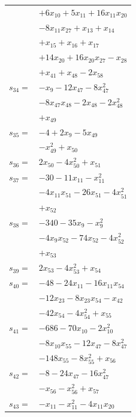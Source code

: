 \begin{longtable}{@{}r@{\;}l@{}}
 & \(\displaystyle +6x_{10} +5x_{11} +16x_{11}x_{20}\) \\
 & \(\displaystyle -8x_{11}x_{27} +x_{13} +x_{14}\) \\
 & \(\displaystyle +x_{15} +x_{16} +x_{17}\) \\
 & \(\displaystyle +14x_{20} +16x_{20}x_{27} -x_{28}\) \\
 & \(\displaystyle +x_{41} +x_{48} -2x_{58}\) \\[3pt]
\(s_{34}=\) & \(\displaystyle -x_{9} -12x_{47} -8x_{47}^{2}\) \\
 & \(\displaystyle -8x_{47}x_{48} -2x_{48} -2x_{48}^{2}\) \\
 & \(\displaystyle +x_{49}\) \\[3pt]
\(s_{35}=\) & \(\displaystyle -4 +2x_{9} -5x_{49}\) \\
 & \(\displaystyle -x_{49}^{2} +x_{50}\) \\[3pt]
\(s_{36}=\) & \(\displaystyle 2x_{50} -4x_{50}^{2} +x_{51}\) \\[3pt]
\(s_{37}=\) & \(\displaystyle -30 -11x_{11} -x_{11}^{2}\) \\
 & \(\displaystyle -4x_{11}x_{51} -26x_{51} -4x_{51}^{2}\) \\
 & \(\displaystyle +x_{52}\) \\[3pt]
\(s_{38}=\) & \(\displaystyle -340 -35x_{9} -x_{9}^{2}\) \\
 & \(\displaystyle -4x_{9}x_{52} -74x_{52} -4x_{52}^{2}\) \\
 & \(\displaystyle +x_{53}\) \\[3pt]
\(s_{39}=\) & \(\displaystyle 2x_{53} -4x_{53}^{2} +x_{54}\) \\[3pt]
\(s_{40}=\) & \(\displaystyle -48 -24x_{11} -16x_{11}x_{54}\) \\
 & \(\displaystyle -12x_{23} -8x_{23}x_{54} -x_{42}\) \\
 & \(\displaystyle -42x_{54} -4x_{54}^{2} +x_{55}\) \\[3pt]
\(s_{41}=\) & \(\displaystyle -686 -70x_{10} -2x_{10}^{2}\) \\
 & \(\displaystyle -8x_{10}x_{55} -12x_{47} -8x_{47}^{2}\) \\
 & \(\displaystyle -148x_{55} -8x_{55}^{2} +x_{56}\) \\[3pt]
\(s_{42}=\) & \(\displaystyle -8 -24x_{47} -16x_{47}^{2}\) \\
 & \(\displaystyle -x_{56} -x_{56}^{2} +x_{57}\) \\[3pt]
\(s_{43}=\) & \(\displaystyle -x_{11} -x_{11}^{2} -4x_{11}x_{20}\) \\

\end{longtable}
